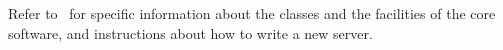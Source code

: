 Refer to \OPDapi\ for specific information about the classes and the
facilities of the \opendap core software, and instructions about how to
write a new server.




%
%
%
%
%
%
%
%
%




